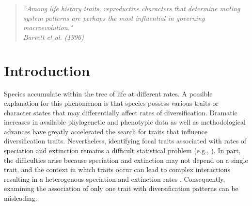 \begin{quote}
\em{``Among life history traits, reproductive characters that determine mating system patterns are perhaps the most influential in governing macroevolution." 
}
\\
\hspace*{\fill}\rm{ Barrett et al. (1996)}
\end{quote}

\section{Introduction}



Species accumulate within the tree of life at different rates.
A possible explanation for this phenomenon is that species possess various traits or character states that may differentially affect rates of diversification. 
Dramatic increases in available phylogenetic and phenotypic data as well as methodological advances have greatly accelerated the search for traits that influence diversification traits.
Nevertheless, identifying focal traits associated with rates of speciation and extinction remains a difficult statistical problem (e.g., \citealt{maddison_2015, rabosky_2015, moore_2016, fitzjohn_2009, goldberg_2012, beaulieu_2016, rabosky_2017}). %
In part, the difficulties arise because speciation and extinction may not depend on a single trait, and the context in which traits occur can lead to complex interactions resulting in a heterogenous speciation and extinction rates \citep{beaulieu_2016, caetano_2018, herrera_2018}.
Consequently, examining the association of only one trait with diversification patterns can be misleading. %

